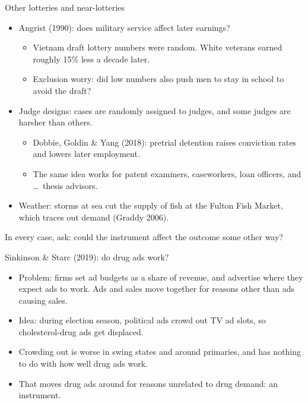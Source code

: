 \documentclass[aspectratio=169,11pt]{beamer}
\begin{document}
\begin{frame}{Other lotteries and near-lotteries}
\begin{itemize}
	\item \alert{Angrist (1990)}: does military service affect later earnings?
	\begin{itemize}
		\item Vietnam draft lottery numbers were random. White veterans earned roughly 15\% less a decade later.
		\item Exclusion worry: did low numbers also push men to stay in school to avoid the draft?
	\end{itemize}
	\item \alert{Judge designs}: cases are randomly assigned to judges, and some judges are harsher than others.
	\begin{itemize}
		\item Dobbie, Goldin \& Yang (2018): pretrial detention raises conviction rates and lowers later employment.
		\item The same idea works for patent examiners, caseworkers, loan officers, and \ldots\ thesis advisors.
	\end{itemize}
	\item \alert{Weather}: storms at sea cut the supply of fish at the Fulton Fish Market, which traces out demand (Graddy 2006).
\end{itemize}
\medskip
In every case, ask: \alert{could the instrument affect the outcome some other way?}
\end{frame}


\begin{frame}{Sinkinson \& Starc (2019): do drug ads work?}
\begin{itemize}
	\item \alert{Problem}: firms set ad budgets as a share of revenue, and advertise where they expect ads to work. Ads and sales move together for reasons other than ads causing sales.
	\item \alert{Idea}: during election season, political ads crowd out TV ad slots, so cholesterol-drug ads get displaced.
	\item Crowding out is worse in \alert{swing states} and around \alert{primaries}, and has nothing to do with how well drug ads work.
	\item That moves drug ads around for reasons \alert{unrelated to drug demand}: an instrument.
\end{itemize}
\end{frame}
\end{document}
